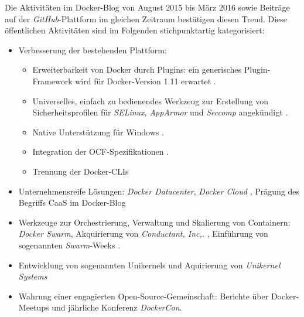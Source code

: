 \documentclass[../main.tex]{subfiles}
\begin{document}
  Die Aktivitäten im Docker-Blog von August 2015 bis März 2016 sowie Beiträge auf der \emph{GitHub}-Plattform im gleichen Zeitraum bestätigen diesen Trend. Diese öffentlichen Aktivitäten sind im Folgenden stichpunktartig kategorisiert:

  \begin{itemize}
    \item Verbesserung der bestehenden Plattform:
      \begin{itemize}
        \item Erweiterbarkeit von Docker durch Plugins: ein generisches Plugin-Framework wird für Docker-Version 1.11 erwartet \cite{githubDockerRoadmap}\cite{https://github.com/docker/docker/pull/15365}.
        \item Universelles, einfach zu bedienendes Werkzeug zur Erstellung von Sicherheitsprofilen für \emph{SELinux}, \emph{AppArmor} und \emph{Seccomp} angekündigt \cite{githubGeneralSecProfiles}.
        \item Native Unterstützung für Windows \cite{dockerWindowsSupport}.
        \item Integration der OCF-Spezifikationen \cite{https://blog.docker.com/2015/12/containerd-daemon-to-control-runc/}\cite{https://blog.docker.com/2015/12/progress-report-open-container-initiative/}.
        \item Trennung der Docker-CLIs
      \end{itemize}
    \item Unternehmensreife Lösungen: \emph{Docker Datacenter}\cite{https://blog.docker.com/2016/03/configuring-load-balancing-service-discovery-docker-universal-control-plane/}\cite{https://blog.docker.com/2016/02/docker-datacenter-caas/}, \emph{Docker Cloud} \cite{https://blog.docker.com/2016/03/announcing-docker-cloud/}, Prägung des Begriffs \glqq{}CaaS\grqq{} im Docker-Blog \cite{https://blog.docker.com/2016/02/containers-as-a-service-caas/}\cite{https://blog.docker.com/2016/02/containers-as-a-service-caas-2/}
    \item Werkzeuge zur Orchestrierung, Verwaltung und Skalierung von Containern: \emph{Docker Swarm}, Akquirierung von \emph{Conductant, Inc,.} \cite{https://blog.docker.com/2016/03/docker-welcomes-aurora-project-creators/}, Einführung von sogenannten \glqq{}\emph{Swarm}-Weeks\grqq{} \cite{https://blog.docker.com/2016/03/get-prepared-swarmweek/}\cite{https://blog.docker.com/2016/02/swarmweek-is-coming/}.
    \item Entwicklung von sogenannten Unikernels und Aquirierung von \emph{Unikernel Systems} \cite{https://blog.docker.com/2016/01/unikernel/}
    \item Wahrung einer engagierten Open-Source-Gemeinschaft: Berichte über Docker-Meetups und jährliche Konferenz \emph{DockerCon}.
  \end{itemize}
\end{document}
